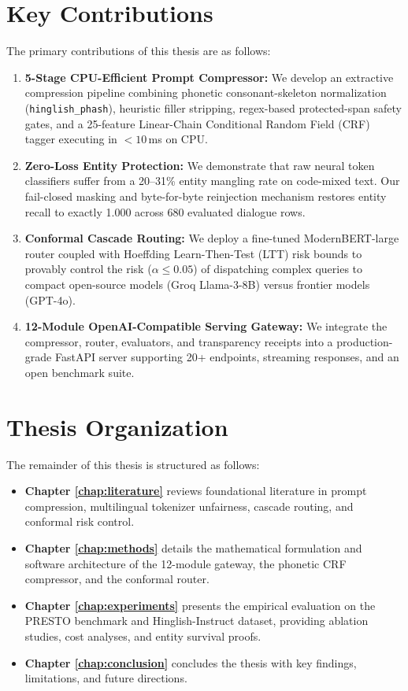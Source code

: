 \section{Key Contributions}
The primary contributions of this thesis are as follows:
\begin{enumerate}
    \item \textbf{5-Stage CPU-Efficient Prompt Compressor:} We develop an extractive compression pipeline combining phonetic consonant-skeleton normalization (\texttt{hinglish\_phash}), heuristic filler stripping, regex-based protected-span safety gates, and a 25-feature Linear-Chain Conditional Random Field (CRF) tagger executing in $<10$\,ms on CPU.
    \item \textbf{Zero-Loss Entity Protection:} We demonstrate that raw neural token classifiers suffer from a 20--31\% entity mangling rate on code-mixed text. Our fail-closed masking and byte-for-byte reinjection mechanism restores entity recall to exactly 1.000 across 680 evaluated dialogue rows.
    \item \textbf{Conformal Cascade Routing:} We deploy a fine-tuned ModernBERT-large router coupled with Hoeffding Learn-Then-Test (LTT) risk bounds to provably control the risk ($\alpha \le 0.05$) of dispatching complex queries to compact open-source models (Groq Llama-3-8B) versus frontier models (GPT-4o).
    \item \textbf{12-Module OpenAI-Compatible Serving Gateway:} We integrate the compressor, router, evaluators, and transparency receipts into a production-grade FastAPI server supporting 20+ endpoints, streaming responses, and an open benchmark suite.
\end{enumerate}

\section{Thesis Organization}
The remainder of this thesis is structured as follows:
\begin{itemize}
    \item \textbf{Chapter \ref{chap:literature}} reviews foundational literature in prompt compression, multilingual tokenizer unfairness, cascade routing, and conformal risk control.
    \item \textbf{Chapter \ref{chap:methods}} details the mathematical formulation and software architecture of the 12-module gateway, the phonetic CRF compressor, and the conformal router.
    \item \textbf{Chapter \ref{chap:experiments}} presents the empirical evaluation on the PRESTO benchmark and Hinglish-Instruct dataset, providing ablation studies, cost analyses, and entity survival proofs.
    \item \textbf{Chapter \ref{chap:conclusion}} concludes the thesis with key findings, limitations, and future directions.
\end{itemize}
